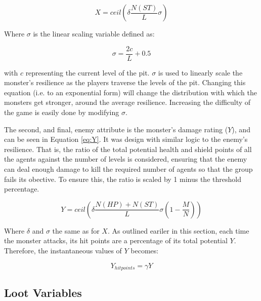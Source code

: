 \begin{equation}\label{eq:X}
    X = ceil \left( \delta \frac{N(ST)}{L} \sigma \right)
\end{equation}

Where $\sigma$ is the linear scaling variable defined as:

\begin{equation}
    \sigma = \frac{2c}{L} + 0.5
\end{equation}

with $c$ representing the current level of the pit. $\sigma$ is used to linearly scale the monster's resilience as the players traverse the levels of the pit. Changing this equation (i.e. to an exponential form) will change the distribution with which the monsters get stronger, around the average resilience. Increasing the difficulty of the game is easily done by modifying $\sigma$.

The second, and final, enemy attribute is the monster's damage rating ($Y$), and can be seen in Equation \ref{eq:Y}. It was design with similar logic to the enemy's resilience. That is, the ratio of the total potential health and shield points of all the agents against the number of levels is considered, ensuring that the enemy can deal enough damage to kill the required number of agents so that the group fails its obective. To ensure this, the ratio is scaled by 1 minus the threshold percentage.  

\begin{equation}\label{eq:Y}
    Y = ceil \left(\delta \frac{N(HP)+N(ST)}{L} \sigma \left(1-\frac{M}{N} \right) \right)
\end{equation}

Where $\delta$ and $\sigma$ the same as for $X$. As outlined eariler in this section, each time the monster attacks, its hit points are a percentage of its total potential $Y$. Therefore, the instantaneous values of $Y$ becomes:

\begin{equation}
    Y_{hit points} = \gamma Y 
\end{equation}


\subsection{Loot Variables} \label{sec: loot}

